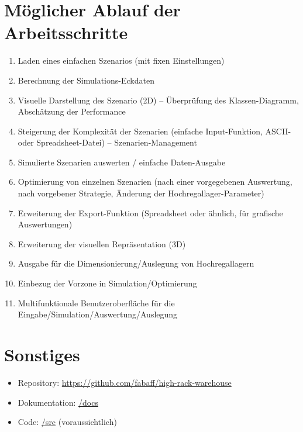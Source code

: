 \documentclass[11pt,a4paper]{article}
\begin{document}
\section{Möglicher Ablauf der Arbeitsschritte}

\begin{enumerate}
  \item Laden eines einfachen Szenarios (mit fixen Einstellungen)
  \item Berechnung der Simulations-Eckdaten
  \item Visuelle Darstellung des Szenario (2D) -- Überprüfung des Klassen-Diagramm, Abschätzung der Performance
  \item Steigerung der Komplexität der Szenarien (einfache Input-Funktion, ASCII- oder Spreadsheet-Datei) -- Szenarien-Management
  \item Simulierte Szenarien auswerten / einfache Daten-Ausgabe
  \item Optimierung von einzelnen Szenarien (nach einer vorgegebenen Auswertung, nach vorgebener Strategie, Änderung der Hochregallager-Parameter)
  \item Erweiterung der Export-Funktion (Spreadsheet oder ähnlich, für grafische Auswertungen)
  \item Erweiterung der visuellen Repräsentation (3D)
  \item Ausgabe für die Dimensionierung/Auslegung von Hochregallagern
  \item Einbezug der Vorzone in Simulation/Optimierung
  \item Multifunktionale Benutzeroberfläche für die Eingabe/Simulation/Auswertung/Auslegung
\end{enumerate}
%
\section{Sonstiges}
\begin{itemize}
  \item Repository: \href{https://github.com/fabaff/high-rack-warehouse}{https://github.com/fabaff/high-rack-warehouse}
  \item Dokumentation: \href{https://github.com/fabaff/high-rack-warehouse/tree/master/docs}{/docs}
  \item Code: \href{https://github.com/fabaff/high-rack-warehouse/}{/src} (voraussichtlich)
\end{itemize}
\end{document}
